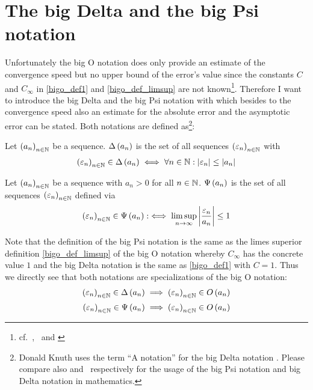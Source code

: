 \section{The big Delta and the big Psi notation}
Unfortunately the big O notation does only provide an estimate of the convergence speed but no upper bound of the error's value since the constants $C$ and $C_\infty$ in \eqref{bigo_def1} and \eqref{bigo_def_limsup} are not known\footnote{cf.~\cite[p.~444]{graham},~\cite{hurkyl_bigo} and \cite{templatetypedef_bigo}}. Therefore I want to introduce the big Delta and the big Psi notation with which besides to the convergence speed also an estimate for the absolute error and the asymptotic error can be stated. Both notations are defined as\footnote{Donald Knuth uses the term ``A notation'' for the big Delta notation \cite{anotation}. Please compare also \cite{tampis_bigpsi} and~\cite{tampis_bigabs} respectively for the usage of the big Psi notation and big Delta notation in mathematics.}:

\begin{definition}
  Let $\left({a_n}\right)_{{n}\in\mathbb N}$ be a sequence. $\Delta\left( {a_n} \right)$ is the set of all sequences $\left({\varepsilon_n}\right)_{{n}\in\mathbb N}$ with
  \begin{align}
    \left({\varepsilon_n}\right)_{{n}\in\mathbb N} \in \Delta\left( {a_n} \right) \iff \forall n\in\mathbb N: \left|{\varepsilon_n}\right| \le \left|{a_n}\right|
  \end{align}
\end{definition}

\begin{definition}
  Let $\left({a_n}\right)_{{n}\in\mathbb N}$ be a sequence with $a_n > 0$ for all $n\in\mathbb N$. $\Psi\left( {a_n} \right)$ is the set of all sequences $\left({\varepsilon_n}\right)_{{n}\in\mathbb N}$ defined via
  \begin{align}
    \left({\varepsilon_n}\right)_{{n}\in\mathbb N} \in \Psi\left( {a_n} \right) :\iff \limsup_{n\to\infty} \left|{\frac{\varepsilon_n}{a_n}}\right| \le 1
  \end{align}
\end{definition}

Note that the definition of the big Psi notation is the same as the limes superior definition \eqref{bigo_def_limsup} of the big O notation whereby $C_\infty$ has the concrete value $1$ and the big Delta notation is the same as \eqref{bigo_def1} with $C=1$. Thus we directly see that both notations are specializations of the big O notation:
\begin{align}
  \seq{\epsilon_n} \in \bigabs{a_n} & \implies \seq{\epsilon_n} \in \bigo{a_n} \nl
  \seq{\epsilon_n} \in \bigpsi{a_n} & \implies \seq{\epsilon_n} \in \bigo{a_n}
\end{align}

